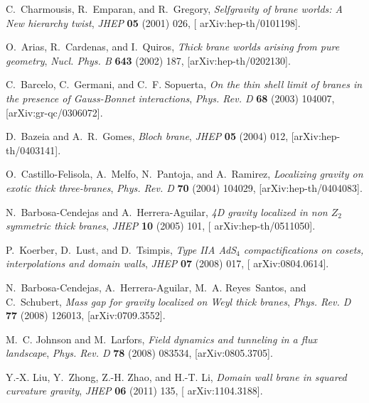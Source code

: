 \begin{thebibliography}{99}
C.~Charmousis, R.~Emparan, and R.~Gregory, \emph{{Selfgravity of brane worlds: A
  New hierarchy twist}},
  {\emph{JHEP} {\bfseries
  05} (2001) 026}, [{{\ttfamily
  arXiv:hep-th/0101198}}].

O.~Arias, R.~Cardenas, and I.~Quiros, \emph{{Thick brane worlds arising from
  pure geometry}},
 {\emph{Nucl. Phys. B}
  {\bfseries 643} (2002) 187},
  [{{\ttfamily arXiv:hep-th/0202130}}].

C.~Barcelo, C.~Germani, and C.~F. Sopuerta, \emph{{On the thin shell limit of
  branes in the presence of Gauss-Bonnet interactions}},
  {\emph{Phys. Rev. D}
  {\bfseries 68} (2003) 104007},
  [{{\ttfamily arXiv:gr-qc/0306072}}].

D.~Bazeia and A.~R.~Gomes, \emph{{Bloch brane}}, {\emph{JHEP} {\bfseries 05} (2004) 012}, [{{\ttfamily arXiv:hep-th/0403141}}].

O.~Castillo-Felisola, A.~Melfo, N.~Pantoja, and A.~Ramirez, \emph{{Localizing gravity on exotic thick three-branes}}, {\emph{Phys. Rev. D}
  {\bfseries 70} (2004) 104029},
  [{{\ttfamily arXiv:hep-th/0404083}}].

N.~Barbosa-Cendejas and A.~Herrera-Aguilar, \emph{{4D gravity localized in non
  $Z_2$ symmetric thick branes}},
  {\emph{JHEP} {\bfseries
  10} (2005) 101}, [{{\ttfamily
  arXiv:hep-th/0511050}}].

P.~Koerber, D.~Lust, and D.~Tsimpis, \emph{{Type IIA AdS$_4$ compactifications on
  cosets, interpolations and domain walls}},
  {\emph{JHEP} {\bfseries
  07} (2008) 017}, [{{\ttfamily
  arXiv:0804.0614}}].

N.~Barbosa-Cendejas, A.~Herrera-Aguilar, M.~A. Reyes~Santos, and C.~Schubert,
  \emph{{Mass gap for gravity localized on Weyl thick branes}},
  {\emph{Phys. Rev. D}
  {\bfseries 77} (2008) 126013},
  [{{\ttfamily arXiv:0709.3552}}].

M.~C. Johnson and M.~Larfors, \emph{{Field dynamics and tunneling in a flux
  landscape}}, {\emph{Phys.
  Rev. D} {\bfseries 78} (2008) 083534},
  [{{\ttfamily arXiv:0805.3705}}].

Y.-X. Liu, Y.~Zhong, Z.-H. Zhao, and H.-T. Li, \emph{{Domain wall brane in
  squared curvature gravity}},
  {\emph{JHEP} {\bfseries 06}
  (2011) 135}, [{{\ttfamily
  arXiv:1104.3188}}].



\end{thebibliography}
